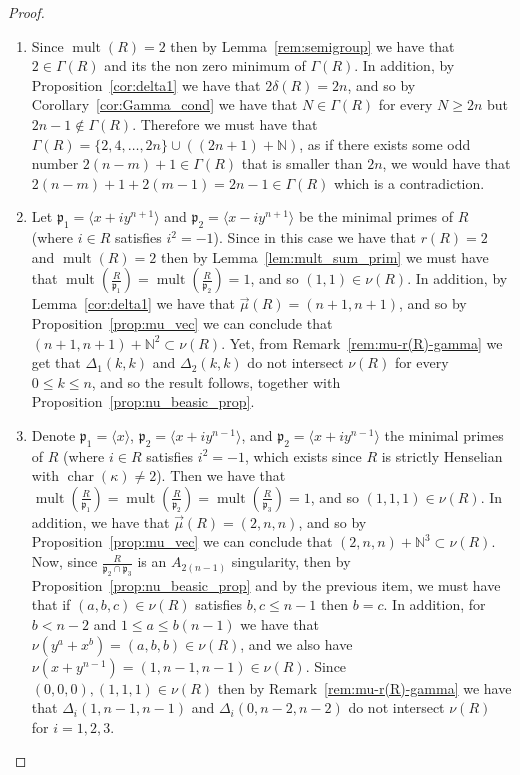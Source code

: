 \documentclass{article}
\DeclareMathOperator{\chara}{char}
\DeclareMathOperator{\mult}{mult}
\numberwithin{theorem}{section}
\begin{document}
\begin{proof}
    \begin{enumerate}
        \item Since $\mult(R)=2$ then by Lemma~\ref{rem:semigroup} we have that $2 \in \Gamma(R)$ and its the non zero minimum of $\Gamma(R)$. In addition, by Proposition~\ref{cor:delta1} we have that $2\delta(R)=2n$, and so by Corollary~\ref{cor:Gamma_cond} we have that $N \in \Gamma(R)$ for every $N \geq 2n$ but $2n-1 \notin \Gamma(R)$. Therefore we must have that $\Gamma(R) = \{2, 4, \dots, 2n\} \cup ((2n+1) + \mathbb{N})$, as if there exists some odd number $2(n-m)+1 \in \Gamma(R)$ that is smaller than $2n$, we would have that $2(n-m)+1 + 2(m-1) = 2n-1 \in \Gamma(R)$ which is a contradiction. 
        
        \item Let $\mathfrak{p}_1 = \langle x+iy^{n+1}\rangle$ and $\mathfrak{p}_2 = \langle x-iy^{n+1}\rangle$ be the minimal primes of $R$ (where $i \in R$ satisfies $i^2=-1$).  Since in this case we have that $r(R)=2$ and $\mult(R)=2$ then by Lemma~\ref{lem:mult_sum_prim} we must have that $\mult\left(\frac{R}{\mathfrak{p}_1}\right)=\mult\left(\frac{R}{\mathfrak{p}_2}\right)=1$, and so $(1,1) \in \nu(R)$. In addition, by Lemma~\ref{cor:delta1} we have that $\vec{\mu}(R)= (n+1, n+1)$, and so by Proposition~\ref{prop:mu_vec} we can conclude that $(n+1, n+1) + \mathbb{N}^2 \subset \nu(R)$. Yet, from Remark~\ref{rem:mu-r(R)-gamma} we get that $\Delta_1(k,k)$ and $\Delta_2(k,k)$ do not intersect $\nu(R)$ for every $0 \leq k \leq n$, and so the result follows, together with Proposition~\ref{prop:nu_beasic_prop}.
        
        \item Denote $\mathfrak{p}_1 = \langle x \rangle$, $\mathfrak{p}_2 = \langle x+iy^{n-1} \rangle$, and $\mathfrak{p}_2 = \langle x+iy^{n-1} \rangle$ the minimal primes of $R$ (where $i \in R$ satisfies $i^2=-1$, which exists since $R$ is strictly Henselian with $\chara(\kappa) \neq 2$). Then we have that $\mult\left(\frac{R}{\mathfrak{p}_1}\right)=\mult\left(\frac{R}{\mathfrak{p}_2}\right)=\mult\left(\frac{R}{\mathfrak{p}_3}\right)=1$, and so $(1,1,1) \in \nu(R)$. In addition, we have that $\vec{\mu}(R)=(2,n,n)$, and so by Proposition~\ref{prop:mu_vec} we can conclude that $(2,n,n) + \mathbb{N}^3 \subset \nu(R)$.  Now, since $\frac{R}{\mathfrak{p}_2 \cap \mathfrak{p}_3}$ is an $A_{2(n-1)}$ singularity, then by Proposition~\ref{prop:nu_beasic_prop} and by the previous item, we must have that if $(a,b,c) \in \nu(R)$ satisfies $b,c  \leq n-1$ then $b=c$. In addition, for $b < n-2$ and $1 \leq a \leq b(n-1)$ we have that $\nu(y^a +x^b) = (a, b, b) \in \nu(R)$, and we also have $\nu(x+y^{n-1})=(1, n-1, n-1) \in \nu(R)$. Since $(0,0,0), (1,1,1) \in \nu(R)$ then by Remark~\ref{rem:mu-r(R)-gamma} we have that $\Delta_i(1, n-1, n-1)$ and $\Delta_i(0, n-2, n-2)$ do not intersect $\nu(R)$ for $i=1,2,3$. 
        

\end{enumerate}
\end{proof}
\end{document}

